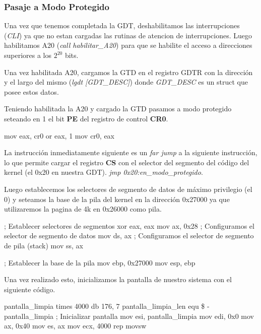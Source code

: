 \subsubsection{Pasaje a Modo Protegido}
Una vez que tenemos completada la GDT, deshabilitamos las interrupciones (\textit{CLI}) ya que no estan cargadas las rutinas de atencion de interrupciones. Luego habilitamos A20 (\textit{call habilitar_A20}) para que se habilite el acceso a direcciones superiores a los $2^{20}$ bits.

Una vez habilitada A20, cargamos la GTD en el registro GDTR con la dirección y el largo del mismo (\textit{lgdt [GDT_DESC]}) donde \textit{GDT_DESC} es un struct que posee estos datos.

Teniendo habilitada la A20 y cargado la GTD pasamos a modo protegido seteando en 1 el bit \textbf{PE} del registro de control \textbf{CR0}.

\begin{algorithm}
		\begin{algorithmic}
			\State mov eax, cr0
			\State or eax, 1
			\State mov cr0, eax
		\end{algorithmic}
\end{algorithm}

La instrucción inmediatamente siguiente es un \textit{far jump} a la siguiente instrucción, lo que permite cargar el registro \textbf{CS} con el selector del segmento del código del kernel (el 0x20 en nuestra GDT). \textit{jmp 0x20:en_modo_protegido}.

Luego establecemos los selectores de segmento de datos de máximo privilegio (el 0) y seteamos la base de la pila del kernel en la dirección 0x27000 ya que utilizaremos la pagina de 4k en 0x26000 como pila.

\begin{algorithm}[H]
		\begin{algorithmic}[H]
			\State ; Establecer selectores de segmentos
			\State xor eax, eax
			\State mov ax, 0x28
			\State ; Configuramos el selector de segmento de datos
			\State mov ds, ax
			\State ; Configuramos el selector de segmento de pila (stack)
			\State mov ss, ax

			\State ; Establecer la base de la pila
			\State mov ebp, 0x27000
			\State mov esp, ebp
		\end{algorithmic}
\end{algorithm}

Una vez realizado esto, inicializamos la pantalla de nuestro sistema con el siguiente código.

\begin{algorithm}[]
		\begin{algorithmic}[H]
			\State pantalla_limpia times 4000 db 176, 7
			\State pantalla_limpia_len equ   \$ - pantalla_limpia
			\State ; Inicializar pantalla
			\State mov esi, pantalla_limpia
			\State mov edi, 0x0
			\State mov ax, 0x40
			\State mov es, ax
			\State mov ecx, 4000
			\State rep movsw
		\end{algorithmic}
\end{algorithm}